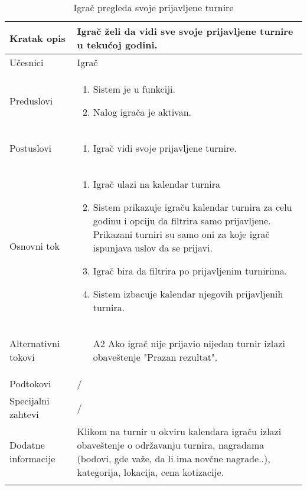 \documentclass{article}
\begin{document}
        \begin{longtable}{| p{} | p{} |} 
            \hline
                Kratak opis & Igrač želi da vidi sve svoje prijavljene turnire u tekućoj godini.\\ 
            \hline    
                Učesnici & Igrač \\
            \hline
               Preduslovi & \begin{enumerate}
                   \item Sistem je u funkciji.
                   \item Nalog igrača je aktivan.
               \end{enumerate}\\
            \hline  
                Postuslovi & \begin{enumerate}
                    \item Igrač vidi svoje prijavljene turnire.
                \end{enumerate}\\
            \hline
                Osnovni tok & \begin{enumerate}
                    \item Igrač ulazi na kalendar turnira
                    \item Sistem prikazuje igraču kalendar turnira za celu godinu i opciju da filtrira samo prijavljene. Prikazani turniri su samo oni za koje igrač ispunjava uslov da se prijavi.
                    \item Igrač bira da filtrira po prijavljenim turnirima.
                    \item Sistem izbacuje kalendar njegovih prijavljenih turnira.
                \end{enumerate}\\
            \hline
                Alternativni tokovi & 
                \begin{itemize}
                    \item[A2] Ako igrač nije prijavio nijedan turnir izlazi obaveštenje "Prazan rezultat".
                \end{itemize}\\
            \hline
                Podtokovi & /\\
            \hline
                Specijalni zahtevi & /\\
            \hline
                Dodatne informacije & Klikom na turnir u okviru kalendara igraču izlazi obaveštenje o održavanju turnira, nagradama (bodovi, gde važe, da li ima novčne nagrade..), kategorija, lokacija, cena kotizacije. \\
            \hline
            \caption{Igrač pregleda svoje prijavljene turnire} 
        \end{longtable}
        
\end{document}

